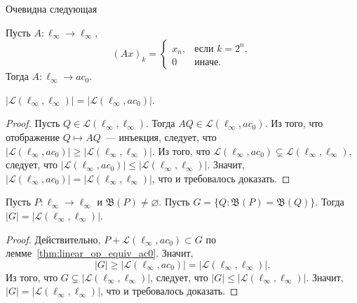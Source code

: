 Очевидна следующая
\begin{lemma}
	Пусть $A:\ell_\infty\to\ell_\infty$,
	\begin{equation}
		(Ax)_k=\begin{cases}
			x_n, & \mbox{если~} k=2^n,
			\\
			0    & \mbox{иначе.}
		\end{cases}
	\end{equation}
	Тогда $A:\ell_\infty\to ac_0$.
\end{lemma}

\begin{corollary}
	$|\mathcal{L}(\ell_\infty,\ell_\infty)|=|\mathcal{L}(\ell_\infty,ac_0)|$.
\end{corollary}

\begin{proof}
	Пусть $Q\in \mathcal{L}(\ell_\infty,\ell_\infty)$.
	Тогда $AQ\in \mathcal{L}(\ell_\infty,ac_0)$.
	Из того, что отображение $Q\mapsto AQ$~--- инъекция,
	следует, что $|\mathcal{L}(\ell_\infty,ac_0)|\geq      |\mathcal{L}(\ell_\infty,\ell_\infty)|$.
	Из того, что $ \mathcal{L}(\ell_\infty,ac_0) \subsetneq \mathcal{L}(\ell_\infty,\ell_\infty) $,
	следует, что $|\mathcal{L}(\ell_\infty,ac_0)|\leq      |\mathcal{L}(\ell_\infty,\ell_\infty)|$.
	Значит,      $|\mathcal{L}(\ell_\infty,ac_0)|=         |\mathcal{L}(\ell_\infty,\ell_\infty)|$,
	что и требовалось доказать.
\end{proof}

\begin{corollary}
	Пусть $P:\ell_\infty \to \ell_\infty$ и $\mathfrak{B}(P)\neq\varnothing$.
	Пусть $G = \{Q: \mathfrak{B}(P)= \mathfrak{B}(Q)\}$.
	Тогда $|G| = |\mathcal{L}(\ell_\infty,\ell_\infty)|$.
\end{corollary}

\begin{proof}
	Действительно,
	$P+\mathcal{L}(\ell_\infty,ac_0) \subset G$ по лемме~\ref{thm:linear_op_equiv_ac0}.
	Значит,
	\begin{equation}
		|G| \geq |\mathcal{L}(\ell_\infty,ac_0)|=|\mathcal{L}(\ell_\infty,\ell_\infty)|
		.
	\end{equation}
	Из того, что $G\subsetneq|\mathcal{L}(\ell_\infty,\ell_\infty)|$,
	следует, что $|G|\leq|\mathcal{L}(\ell_\infty,\ell_\infty)|$.
	Значит, $|G|=|\mathcal{L}(\ell_\infty,\ell_\infty)|$,
	что и требовалось доказать.
\end{proof}



